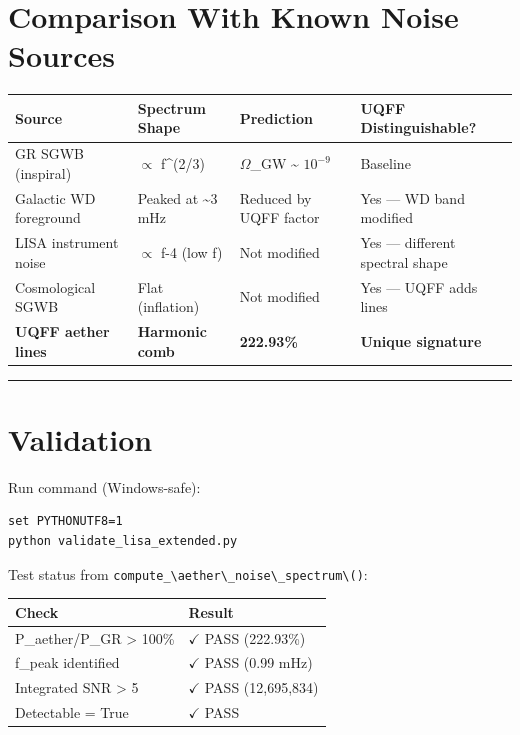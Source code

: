 \documentclass[12pt,a4paper]{article}
\begin{document}
\section{Comparison With Known Noise Sources}

\begin{table}[H]
\centering
\small
\begin{tabularx}{\linewidth}{@{}>{\raggedright\arraybackslash}X>{\raggedright\arraybackslash}X>{\raggedright\arraybackslash}X>{\raggedright\arraybackslash}X@{}}
\toprule
Source & Spectrum Shape & Prediction & UQFF Distinguishable? \tabularnewline
\midrule
GR SGWB (inspiral) & $\propto$ f\^{}(2/3) & $\Omega$\_GW \textasciitilde{} $10^{-9}$ & Baseline \tabularnewline
Galactic WD foreground & Peaked at \textasciitilde{}3 mHz & Reduced by UQFF factor & Yes --- WD band modified \tabularnewline
LISA instrument noise & $\propto$ f-4 (low f) & Not modified & Yes --- different spectral shape \tabularnewline
Cosmological SGWB & Flat (inflation) & Not modified & Yes --- UQFF adds lines \tabularnewline
\textbf{UQFF aether lines} & \textbf{Harmonic comb} & \textbf{222.93\%} & \textbf{Unique signature} \tabularnewline
\bottomrule
\end{tabularx}
\end{table}

\medskip\hrule\medskip

\section{Validation}

Run command (Windows-safe):

\begin{verbatim}
set PYTHONUTF8=1
python validate_lisa_extended.py
\end{verbatim}

Test status from \texttt{compute\_\textbackslash {aether\textbackslash \_noise\textbackslash \_spectrum\textbackslash }()}:

\begin{table}[H]
\centering
\small
\begin{tabularx}{\linewidth}{@{}>{\raggedright\arraybackslash}X>{\raggedright\arraybackslash}X@{}}
\toprule
Check & Result \tabularnewline
\midrule
P\_aether/P\_GR > 100\% & $\checkmark$ PASS (222.93\%) \tabularnewline
f\_peak identified & $\checkmark$ PASS (0.99 mHz) \tabularnewline
Integrated SNR > 5 & $\checkmark$ PASS (12,695,834) \tabularnewline
Detectable = True & $\checkmark$ PASS \tabularnewline
\bottomrule
\end{tabularx}
\end{table}
\end{document}
